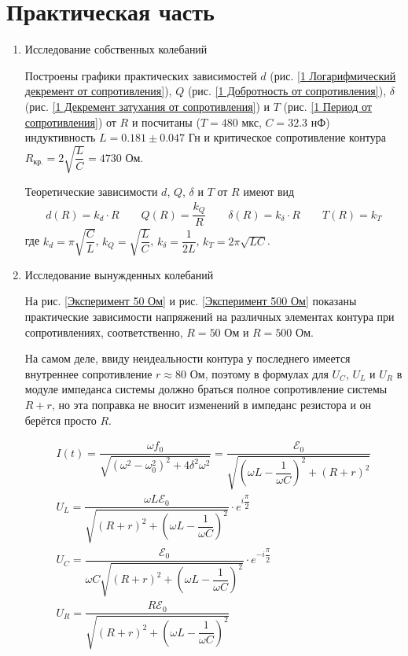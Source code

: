 \documentclass[a4paper, usenames, dvipsnames]{article}
\begin{document}
\section*{\centering Практическая часть}

\begin{enumerate}
    \item Исследование собственных колебаний

          Построены графики практических зависимостей $d$ (рис. \ref{1 Логарифмический декремент от сопротивления}),
          $Q$ (рис. \ref{1 Добротность от сопротивления}), $\delta$ (рис. \ref{1 Декремент затухания от сопротивления})
          и $T$ (рис. \ref{1 Период от сопротивления}) от $R$
          и посчитаны ($T = 480$ мкс, $C = 32.3$ нФ) индуктивность $L = 0.181 \pm 0.047$ Гн
          и критическое сопротивление контура $R_\text{кр.} = 2 \sqrt{\dfrac{L}{C}} = 4730$ Ом.

          Теоретические зависимости $d$, $Q$, $\delta$ и $T$ от $R$ имеют вид
          \begin{gather*}
              d(R) = k_d \cdot R \hspace{2em} Q(R) = \dfrac{k_Q}{R} \hspace{2em} \delta(R) = k_\delta \cdot R \hspace{2em} T(R) = k_T
          \end{gather*}
          где $k_d = \pi\sqrt{\dfrac{C}{L}}$, $k_Q = \sqrt{\dfrac{L}{C}}$, $k_\delta = \dfrac{1}{2L}$, $k_T = 2\pi\sqrt{LC}$.

    \item Исследование вынужденных колебаний

          На рис. \ref{Эксперимент 50 Ом} и рис. \ref{Эксперимент 500 Ом} показаны
          практические зависимости напряжений на различных элементах контура
          при сопротивлениях, соответственно, $R = 50$ Ом и $R = 500$ Ом.

          На самом деле, ввиду неидеальности контура у последнего имеется внутреннее сопротивление $r \approx 80$ Ом,
          поэтому в формулах для $U_C$, $U_L$ и $U_R$ в модуле импеданса системы должно браться полное сопротивление системы $R + r$,
          но эта поправка не вносит изменений в импеданс резистора и он берётся просто $R$.

            \begin{gather*}
                I(t) = \dfrac{\omega f_0}{\sqrt{(\omega^2 - \omega_0^2)^2 + 4\delta^2\omega^2}} = \dfrac{\mathcal{E}_0}{\sqrt{\left(\omega L - \dfrac{1}{\omega C}\right)^2 + (R + r)^2}} \\
                U_L = \dfrac{\omega L \mathcal{E}_0}{\sqrt{(R + r)^2 + \left(\omega L - \dfrac{1}{\omega C}\right)^2}} \cdot e^{i\dfrac{\pi}{2}} \\
                U_C = \dfrac{\mathcal{E}_0}{\omega C \sqrt{(R + r)^2 + \left(\omega L - \dfrac{1}{\omega C}\right)^2}} \cdot e^{-i\dfrac{\pi}{2}} \\
                U_R = \dfrac{R \mathcal{E}_0}{\sqrt{(R + r)^2 + \left(\omega L - \dfrac{1}{\omega C}\right)^2}}
            \end{gather*}


\end{enumerate}
\end{document}
